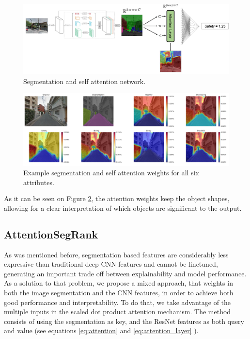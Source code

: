 \begin{figure}[ht]
	\begin{center}
	\includegraphics[width=1\textwidth]{./figures/self_attn.png}
	\caption[Self Attention network]{Segmentation and self attention network.}
	\label{fig:selfsegrank}
	\end{center}
\end{figure}

\begin{figure}[ht]
	\begin{center}
	\includegraphics[width=1\textwidth]{./figures/self_attn_vis.png}
	\caption[Self Attention Model output]{Example segmentation and self attention weights for all six attributes.}
	\label{fig:segrank_attention}
	\end{center}
\end{figure}

As it can be seen on Figure \ref{fig:segrank_attention}, the attention weights keep the object shapes,
allowing for a clear interpretation of which objects are significant to the output.

\subsection{AttentionSegRank}
As was mentioned before, segmentation based features are considerably less expressive than
traditional deep CNN features and cannot be finetuned, generating an important trade off between explainability and model performance.
As a solution to that problem, we propose a mixed approach, that weights in both the image segmentation
and the CNN features, in order to achieve both good performance and interpretability. To do that,
we take advantage of the multiple inputs in the scaled dot product attention mechanism. The method consists
of using the segmentation as key, and the ResNet features as both query and value (see equations \ref{eq:attention} and \ref{eq:attention_layer} ).

